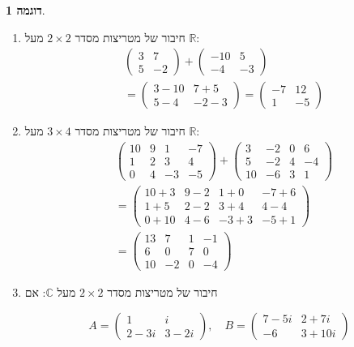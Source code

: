 \documentclass[12pt]{report}
\theoremstyle{plain}
\theoremstyle{definition}
\newtheorem{example}{דוגמה}[chapter]
\newcommand{\R}{\mathbb{R}}
\newcommand{\C}{\mathbb{C}}
\newcommand{\0}{\mathbf{0}}
\begin{document}
\begin{example}
    \begin{enumerate}[label=\alph*.]
        \item
חיבור של מטריצות מסדר
$2\times 2$
מעל $\R$:
$$
\begin{aligned}
&\begin{pmatrix} 3 & 7 \\
5 & -2 
\end{pmatrix}+\begin{pmatrix} -10 & 5 \\
-4 & -3 
\end{pmatrix}\\
&=\begin{pmatrix} 3-10 & 7+5 \\
5-4 & -2-3 
\end{pmatrix}=\begin{pmatrix} -7 & 12 \\
1 & -5 
\end{pmatrix}
\end{aligned}
$$


\item
חיבור של מטריצות מסדר
$3\times 4$
מעל $\R$:
$$
\begin{aligned}
&\begin{pmatrix} 10 & 9 & 1 & -7\\
1 & 2 & 3 & 4\\
0 & 4 & -3 & -5
\end{pmatrix}+\begin{pmatrix} 3 & -2 & 0 & 6\\
5 & -2 & 4 & -4\\
10 & -6 & 3 & 1
\end{pmatrix}\\
&=\begin{pmatrix} 10+3 & 9-2 & 1+0 & -7+6\\
1+5 & 2-2 & 3+4 & 4-4\\
0+10 & 4-6 & -3+3 & -5+1
\end{pmatrix}\\
&=\begin{pmatrix} 13 & 7 & 1 & -1\\
6 & 0 & 7 & 0\\
10 & -2 & 0 & -4
\end{pmatrix}
\end{aligned}
$$


\item
חיבור של מטריצות מסדר
$2\times 2$
מעל $\C$:
אם

$$ A = \begin{pmatrix} 1 & i \\
2-3i & 3-2i 
\end{pmatrix},\quad  B = \begin{pmatrix} 7-5i & 2+7i \\
-6 & 3+10i 
\end{pmatrix}$$


\end{enumerate}
\end{example}
\end{document}
